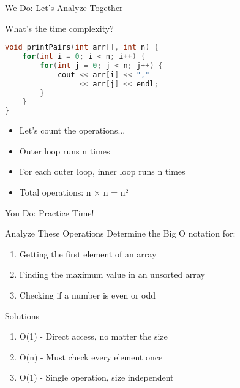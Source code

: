 \documentclass{beamer}
\begin{document}
\begin{frame}[fragile]{We Do: Let's Analyze Together}
    \begin{block}{What's the time complexity?}
    \end{block}
    \begin{lstlisting}[language=C++, basicstyle=\small]
void printPairs(int arr[], int n) {
    for(int i = 0; i < n; i++) {
        for(int j = 0; j < n; j++) {
            cout << arr[i] << "," 
                 << arr[j] << endl;
        }
    }
}
    \end{lstlisting}
    \pause
    \begin{itemize}
        \item Let's count the operations...
        \item Outer loop runs n times
        \item For each outer loop, inner loop runs n times
        \item Total operations: n × n = n²
    \end{itemize}
\end{frame}

\begin{frame}{You Do: Practice Time!}
    \begin{block}{Analyze These Operations}
        Determine the Big O notation for:
    \end{block}
    \begin{enumerate}
        \item Getting the first element of an array
        \item Finding the maximum value in an unsorted array
        \item Checking if a number is even or odd
    \end{enumerate}
    \pause
    \begin{alertblock}{Solutions}
        \begin{enumerate}
            \item O(1) - Direct access, no matter the size
            \item O(n) - Must check every element once
            \item O(1) - Single operation, size independent
        \end{enumerate}
    \end{alertblock}
\end{frame}
\end{document}
